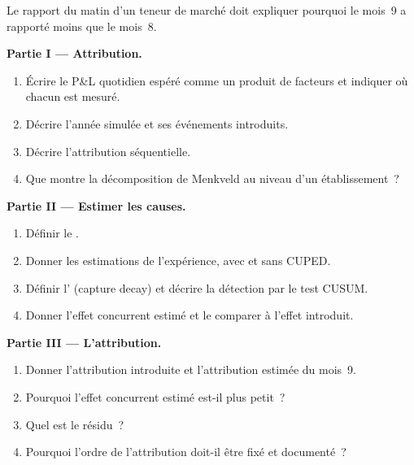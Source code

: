 \begin{problem}\label{pb:hf:pnl-analytics-and-the-strategy-lifecycle:1}
Le rapport du matin d'un teneur de marché doit expliquer pourquoi le mois~9 a rapporté moins que le mois~8.

\medskip\noindent\textbf{Partie I --- Attribution.}
\begin{enumerate}
\item Écrire le P\&L quotidien espéré comme un produit de facteurs et indiquer où chacun est mesuré.
\item Décrire l'année simulée et ses événements introduits.
\item Décrire l'attribution séquentielle.
\item Que montre la décomposition de Menkveld au niveau d'un établissement~?
\end{enumerate}

\medskip\noindent\textbf{Partie II --- Estimer les causes.}
\begin{enumerate}[resume]
\item Définir le .
\item Donner les estimations de l'expérience, avec et sans CUPED.
\item Définir l' (capture decay) et décrire la détection par le test CUSUM.
\item Donner l'effet concurrent estimé et le comparer à l'effet introduit.
\end{enumerate}

\medskip\noindent\textbf{Partie III --- L'attribution.}
\begin{enumerate}[resume]
\item Donner l'attribution introduite et l'attribution estimée du mois~9.
\item Pourquoi l'effet concurrent estimé est-il plus petit~?
\item Quel est le résidu~?
\item Pourquoi l'ordre de l'attribution doit-il être fixé et documenté~?
\end{enumerate}


\end{problem}
